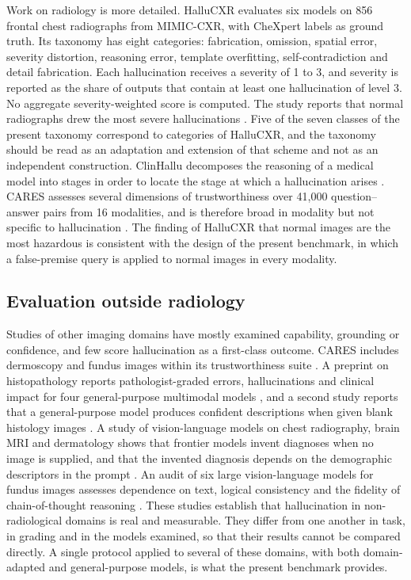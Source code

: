 \documentclass[11pt,a4paper]{article}
\begin{document}
Work on radiology is more detailed. HalluCXR evaluates six models on 856 frontal chest radiographs from MIMIC-CXR, with CheXpert labels as ground truth. Its taxonomy has eight categories: fabrication, omission, spatial error, severity distortion, reasoning error, template overfitting, self-contradiction and detail fabrication. Each hallucination receives a severity of 1 to 3, and severity is reported as the share of outputs that contain at least one hallucination of level 3. No aggregate severity-weighted score is computed. The study reports that normal radiographs drew the most severe hallucinations \citep{wang2026hallucxr}. Five of the seven classes of the present taxonomy correspond to categories of HalluCXR, and the taxonomy should be read as an adaptation and extension of that scheme and not as an independent construction. ClinHallu decomposes the reasoning of a medical model into stages in order to locate the stage at which a hallucination arises \citep{yang2026clinhallu}. CARES assesses several dimensions of trustworthiness over 41,000 question--answer pairs from 16 modalities, and is therefore broad in modality but not specific to hallucination \citep{xia2024cares}. The finding of HalluCXR that normal images are the most hazardous is consistent with the design of the present benchmark, in which a false-premise query is applied to normal images in every modality.

\subsection{Evaluation outside radiology}
\label{subsec:rw_nonrad}

Studies of other imaging domains have mostly examined capability, grounding or confidence, and few score hallucination as a first-class outcome. CARES includes dermoscopy and fundus images within its trustworthiness suite \citep{xia2024cares}. A preprint on histopathology reports pathologist-graded errors, hallucinations and clinical impact for four general-purpose multimodal models \citep{lami2026histopathology}, and a second study reports that a general-purpose model produces confident descriptions when given blank histology images \citep{hasan2026seeing}. A study of vision-language models on chest radiography, brain MRI and dermatology shows that frontier models invent diagnoses when no image is supplied, and that the invented diagnosis depends on the demographic descriptors in the prompt \citep{vohra2026hearsay}. An audit of six large vision-language models for fundus images assesses dependence on text, logical consistency and the fidelity of chain-of-thought reasoning \citep{zhang2026fundus}. These studies establish that hallucination in non-radiological domains is real and measurable. They differ from one another in task, in grading and in the models examined, so that their results cannot be compared directly. A single protocol applied to several of these domains, with both domain-adapted and general-purpose models, is what the present benchmark provides.
\end{document}
